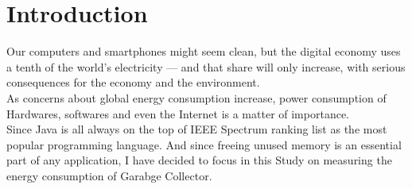 \chapter*{Introduction}
	\thispagestyle{introduction}
	
	Our computers and smartphones might seem clean, but the digital economy uses a tenth of the world's electricity — and that share will only increase, with serious consequences for the economy and the environment.\cite{time}\\
	As concerns about global energy consumption increase, power consumption of Hardwares, softwares and even the Internet is a matter of importance.\\
	
	Since Java is all always on the top of IEEE Spectrum ranking list as the most popular programming language\cite{ieee}. And since freeing unused memory is an essential part of any application, I have decided to focus in this Study on measuring the energy consumption of Garabge Collector\cite{gc}.